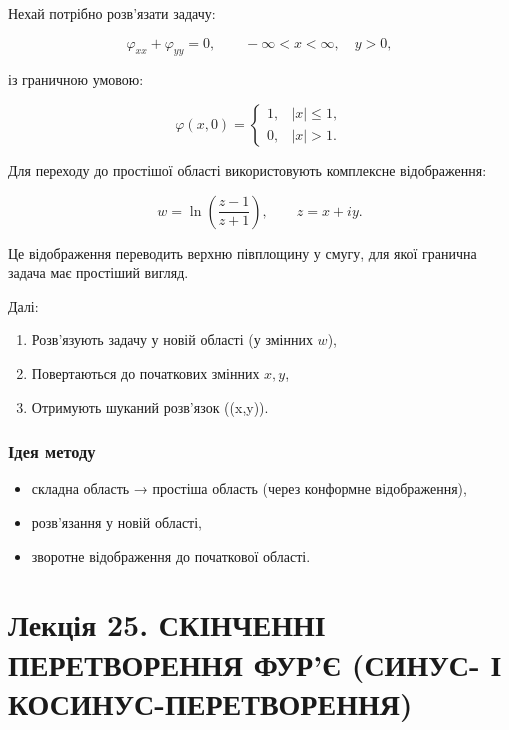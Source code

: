 \documentclass[
  ukrainian,
]{article}
\providecommand{\tightlist}{%
  \setlength{\itemsep}{0pt}\setlength{\parskip}{0pt}}
\begin{document}
Нехай потрібно розв'язати задачу:

\[
\varphi_{xx} + \varphi_{yy} = 0, \qquad -\infty < x < \infty,\quad y > 0,
\]

із граничною умовою:

\[
\varphi(x,0) =
\begin{cases}
1, & |x| \le 1, \\
0, & |x| > 1.
\end{cases}
\]

Для переходу до простішої області використовують комплексне
відображення:

\[
w = \ln\!\left(\frac{z - 1}{z + 1}\right), \qquad z = x + iy.
\]

Це відображення переводить верхню півплощину у смугу, для якої гранична
задача має простіший вигляд.

Далі:

\begin{enumerate}
\def\labelenumi{\arabic{enumi}.}
\tightlist
\item
  Розв'язують задачу у новій області (у змінних \(w\)),
\item
  Повертаються до початкових змінних \(x, y\),
\item
  Отримують шуканий розв'язок (\varphi(x,y)).
\end{enumerate}

\subsubsection{Ідея
методу}\label{ux456ux434ux435ux44f-ux43cux435ux442ux43eux434ux443}

\begin{itemize}
\tightlist
\item
  складна область → простіша область (через конформне відображення),
\item
  розв'язання у новій області,
\item
  зворотне відображення до початкової області.
\end{itemize}

\section{Лекція 25. СКІНЧЕННІ ПЕРЕТВОРЕННЯ ФУР'Є (СИНУС- І
КОСИНУС-ПЕРЕТВОРЕННЯ)}\label{ux43bux435ux43aux446ux456ux44f-25.-ux441ux43aux456ux43dux447ux435ux43dux43dux456-ux43fux435ux440ux435ux442ux432ux43eux440ux435ux43dux43dux44f-ux444ux443ux440ux454-ux441ux438ux43dux443ux441--ux456-ux43aux43eux441ux438ux43dux443ux441-ux43fux435ux440ux435ux442ux432ux43eux440ux435ux43dux43dux44f}
\end{document}
